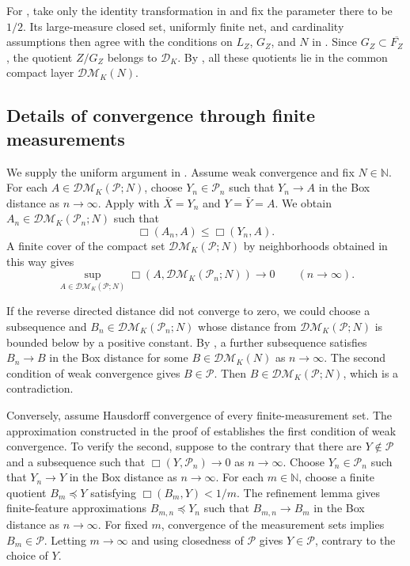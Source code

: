\documentclass[11pt]{amsart}
\theoremstyle{plain}
\theoremstyle{definition}
\theoremstyle{remark}
\newcommand{\DK}{\mathcal D_K}
\newcommand{\DM}{\mathcal{DM}}
\begin{document}
For , take only the identity transformation in \cite[Lemma~4.12]{gds2} and fix the parameter there to be $1/2$. Its large-measure closed set, uniformly finite net, and cardinality assumptions then agree with the conditions on $L_Z$, $G_Z$, and $N$ in . Since $G_Z\subset\overline{F_Z}$, the quotient $Z/G_Z$ belongs to $\DK$. By , all these quotients lie in the common compact layer $\DM_K(N)$.

\subsection{Details of convergence through finite measurements}
\label{subsec:app-pyramid-measurements}

We supply the uniform argument in . Assume weak convergence and fix $N\in\mathbb N$. For each $A\in\DM_K(\mathcal P;N)$, choose $Y_n\in\mathcal P_n$ such that $Y_n\to A$ in the Box distance as $n\to\infty$. Apply  with $\bar X=Y_n$ and $Y=\bar Y=A$. We obtain $A_n\in\DM_K(\mathcal P_n;N)$ such that
\[
\Box(A_n,A)\leq\Box(Y_n,A).
\]
A finite cover of the compact set $\DM_K(\mathcal P;N)$ by neighborhoods obtained in this way gives
\[
\sup_{A\in\DM_K(\mathcal P;N)}\Box(A,\DM_K(\mathcal P_n;N))\longrightarrow0\qquad(n\to\infty).
\]

If the reverse directed distance did not converge to zero, we could choose a subsequence and $B_n\in\DM_K(\mathcal P_n;N)$ whose distance from $\DM_K(\mathcal P;N)$ is bounded below by a positive constant. By , a further subsequence satisfies $B_n\to B$ in the Box distance for some $B\in\DM_K(N)$ as $n\to\infty$. The second condition of weak convergence gives $B\in\mathcal P$. Then $B\in\DM_K(\mathcal P;N)$, which is a contradiction.

Conversely, assume Hausdorff convergence of every finite-measurement set. The approximation constructed in the proof of  establishes the first condition of weak convergence. To verify the second, suppose to the contrary that there are $Y\notin\mathcal P$ and a subsequence such that $\Box(Y,\mathcal P_n)\to0$ as $n\to\infty$. Choose $Y_n\in\mathcal P_n$ such that $Y_n\to Y$ in the Box distance as $n\to\infty$. For each $m\in\mathbb N$, choose a finite quotient $B_m\preceq Y$ satisfying $\Box(B_m,Y)<1/m$. The refinement lemma gives finite-feature approximations $B_{m,n}\preceq Y_n$ such that $B_{m,n}\to B_m$ in the Box distance as $n\to\infty$. For fixed $m$, convergence of the measurement sets implies $B_m\in\mathcal P$. Letting $m\to\infty$ and using closedness of $\mathcal P$ gives $Y\in\mathcal P$, contrary to the choice of $Y$.
\end{document}
